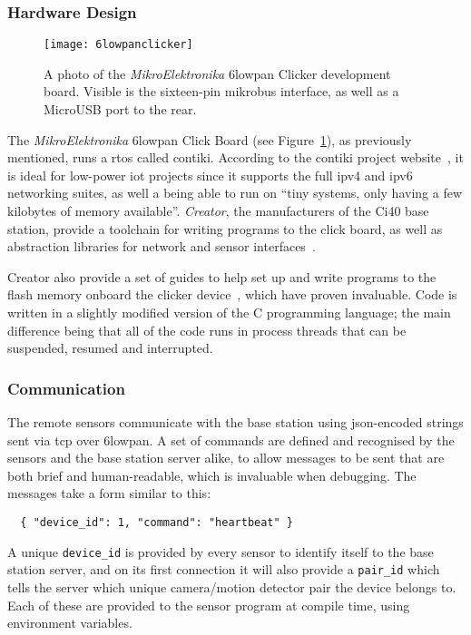 \subsubsection{Hardware Design}

\begin{figure}
  \centering
  \texttt{[image: 6lowpanclicker]}
  \caption{A photo of the \textit{MikroElektronika} \gls{6lowpan} Clicker
  development board. Visible is the sixteen-pin \gls{mikrobus} interface, as
  well as a MicroUSB port to the rear.}
  \label{fig:6lowpanclicker}
\end{figure}

The \textit{MikroElektronika} \gls{6lowpan} Click Board (see
Figure~\ref{fig:6lowpanclicker}), as previously mentioned, runs a
\acrfull{rtos} called \gls{contiki}. According to the \gls{contiki} project
website~\cite{contiki}, it is ideal for low-power \acrshort{iot} projects
since it supports the full \acrshort{ipv4} and \acrshort{ipv6} networking
suites, as well a being able to run on ``tiny systems, only having a few
kilobytes of memory available''. \textit{Creator}, the manufacturers of the
Ci40 base station, provide a toolchain for writing programs to the click
board, as well as abstraction libraries for network and sensor
interfaces~\cite{letmecreate}.

Creator also provide a set of guides to help set up and write programs to the
flash memory onboard the clicker device~\cite{clickersetupguide}, which have
proven invaluable. Code is written in a slightly modified version of the C
programming language; the main difference being that all of the code runs in
process threads that can be suspended, resumed and interrupted.

\subsubsection{Communication}
The remote sensors communicate with the base station using
\acrshort{json}-encoded strings sent via \acrshort{tcp} over \gls{6lowpan}. A
set of commands are defined and recognised by the sensors and the base
station server alike, to allow messages to be sent that are both brief and
human-readable, which is invaluable when debugging. The messages take a form similar to this:

\begin{verbatim}
  { "device_id": 1, "command": "heartbeat" }
\end{verbatim}

A unique \texttt{device\_id} is provided by every sensor to identify itself
to the base station server, and on its first connection it will also provide
a \texttt{pair\_id} which tells the server which unique camera/motion
detector pair the device belongs to. Each of these are provided to the sensor
program at compile time, using environment variables.~

